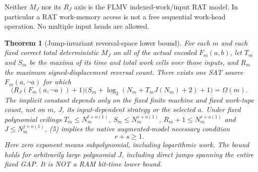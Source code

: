 \documentclass[11pt]{article}
\newtheorem{theorem}{Theorem}
\begin{document}
Neither $M_J$ nor its $R_J$ axis is the FLMV indexed-work/input RAT model. In particular a RAT work-memory access is not a free sequential work-head operation. No multiple input heads are allowed.

\begin{theorem}[Jump-invariant reversal-space lower bound]\label{th:reversal}
For each $m$ and each fixed correct total deterministic $M_J$ on all of the actual encoded $F_m(a,b)$, let $T_m$ and $S_m$ be the maxima of its time and total work cells over those inputs, and $R_m$ the maximum signed-displacement reversal count. There exists one \emph{SAT} source $F_m(a,\neg a)$ for which
\[
\boxed{\bigl(R_J(F_m(a,\neg a))+1\bigr)
 \bigl(S_m+\log_2(N_m+T_mJ(N_m)+2)+1\bigr)=\Omega(m).}\tag{5}
\]
The implicit constant depends only on the fixed finite machine and fixed work-tape count, not on $m$, $J$, its input-dependent strategy or the selected $a$. Under fixed polynomial ceilings $T_m\le N_m^{t+o(1)}$, $S_m\le N_m^{s+o(1)}$, $R_m+1\le N_m^{r+o(1)}$ and $J\le N_m^{j+o(1)}$, (5) implies the \emph{native augmented-model necessary condition}
\[
\boxed{\ r+s\ge1.\ }\tag{6}
\]
Here zero exponent means subpolynomial, including logarithmic work. The bound holds for arbitrarily large polynomial $J$, including direct jumps spanning the entire fixed GAP. It is NOT a RAM bit-time lower bound.
\end{theorem}
\end{document}
